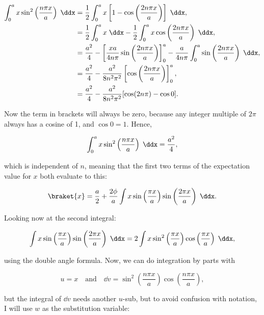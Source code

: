 \begin{align*}
    \int_0^a x\sin^2 \left( \frac{n\pi x}{a} \right) \;\ddx &= \frac{1}{2}\int_0^a x\left[1 - \cos\left( \frac{2n\pi x}{a} \right)\right] \;\ddx, \\
    &= \frac{1}{2}\int_0^a x\;\ddx - \frac{1}{2}\int_0^a x\cos \left( \frac{2n\pi x}{a} \right)\;\ddx, \\
    &= \frac{a^2}{4} - \left[\frac{xa}{4n\pi}\sin\left( \frac{2n\pi x}{a} \right)\right]_0^a - \frac{a}{4n\pi} \int_0^a \sin\left( \frac{2n\pi x}{a} \right)\;\ddx, \\
    &= \frac{a^2}{4} - \frac{a^2}{8n^2\pi^2} \left[\cos\left( \frac{2n\pi x}{a} \right)\right]_0^a, \\
    &= \frac{a^2}{4} - \frac{a^2}{8n^2\pi^2} [\cos(2n\pi) - \cos0].
\end{align*}

Now the term in brackets will always be zero, because any integer multiple of $2\pi$ always has a cosine of 1, and $\cos0=1$. Hence, 

\begin{equation*}
    \int_0^a x\sin^2 \left( \frac{n\pi x}{a} \right) \;\ddx = \frac{a^2}{4},
\end{equation*}

which is independent of $n$, meaning that the first two terms of the expectation value for $x$ both evaluate to this:

\begin{equation*}
    \braket{x} = \frac{a}{2} + \frac{2\phi}{a}\int x\sin\left( \frac{\pi x}{a} \right)\sin\left( \frac{2\pi x}{a} \right) \;\ddx.
\end{equation*}

Looking now at the second integral:

\begin{equation*}
    \int x\sin\left( \frac{\pi x}{a} \right)\sin\left( \frac{2\pi x}{a} \right) \;\ddx = 2\int x\sin^2\left( \frac{\pi x}{a} \right)\cos\left( \frac{\pi x}{a} \right) \;\ddx,
\end{equation*}

using the double angle formula. Now, we can do integration by parts with

\begin{equation*}
    u = x \quad \mathrm{and} \quad \dd v = \sin^2\left( \frac{n\pi x}{a} \right)\cos\left( \frac{n\pi x}{a} \right),
\end{equation*}

but the integral of $\dd v$ needs another $u$-sub, but to avoid confusion with notation, I will use $w$ as the substitution variable:

